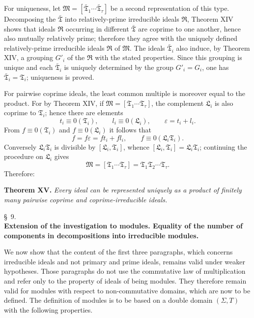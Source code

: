\documentclass[11pt]{article}
\providecommand{\ideal}[1]{\mathfrak{#1}}
\begin{document}
For uniqueness, let $\ideal M=[\bar{\ideal T}_1\cdots\bar{\ideal T}_\tau]$ be a second representation of this type. Decomposing the $\bar{\ideal T}$ into relatively-prime irreducible ideals $\ideal R$, Theorem XIV shows that ideals $\ideal R$ occurring in different $\bar{\ideal T}$ are coprime to one another, hence also mutually relatively prime; therefore they agree with the uniquely defined relatively-prime irreducible ideals $\ideal R$ of $\ideal M$. The ideals $\bar{\ideal T}_i$ also induce, by Theorem XIV, a grouping $G'_i$ of the $\ideal R$ with the stated properties. Since this grouping is unique and each $\bar{\ideal T}_i$ is uniquely determined by the group $G'_i=G_i$, one has $\bar{\ideal T}_i=\ideal T_i$; uniqueness is proved.

For pairwise coprime ideals, the least common multiple is moreover equal to the product. For by Theorem XIV, if $\ideal M=[\ideal T_1\cdots\ideal T_\tau]$, the complement $\ideal L_i$ is also coprime to $\ideal T_i$; hence there are elements
\[
 t_i\equiv0(\ideal T_i),
 \qquad
 l_i\equiv0(\ideal L_i),
 \qquad
 \varepsilon=t_i+l_i.
\]
From $f\equiv0(\ideal T_i)$ and $f\equiv0(\ideal L_i)$ it follows that
\[
 f=f\varepsilon=ft_i+fl_i,
 \qquad
 f\equiv0(\ideal L_i\ideal T_i).
\]
Conversely $\ideal L_i\ideal T_i$ is divisible by $[\ideal L_i,
\ideal T_i]$, whence $[\ideal L_i,
\ideal T_i]=\ideal L_i\ideal T_i$; continuing the procedure on $\ideal L_i$ gives
\[
 \ideal M=[\ideal T_1\cdots\ideal T_\tau]
       =\ideal T_1\ideal T_2\cdots\ideal T_\tau.
\]
Therefore:

\textbf{Theorem XV.} \emph{Every ideal can be represented uniquely as a product of finitely many pairwise coprime and coprime-irreducible ideals.}

\providecommand{\eqzero}[1]{\equiv 0\,(#1)}
\providecommand{\ideal}[1]{\mathfrak{#1}}
\setcounter{footnote}{34}

\begin{center}
\S~9.\\[0.25em]
\textbf{Extension of the investigation to modules. Equality of the number of components in decompositions into irreducible modules.}
\end{center}

We now show that the content of the first three paragraphs, which concerns irreducible ideals and not primary and prime ideals, remains valid under weaker hypotheses. Those paragraphs do not use the commutative law of multiplication and refer only to the property of ideals of being modules. They therefore remain valid for modules with respect to non-commutative domains, which are now to be defined. The definition of modules is to be based on a double domain $(\Sigma,T)$ with the following properties.
\end{document}
